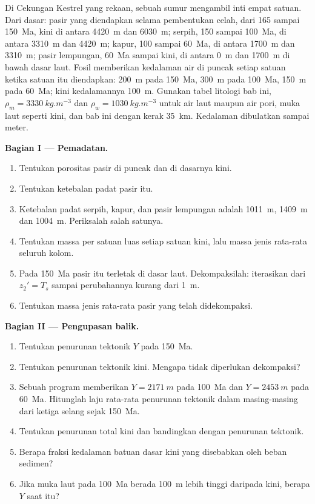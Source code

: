 \begin{problem}\label{pb:b2:basins-compared:1}
Di Cekungan Kestrel yang rekaan, sebuah sumur mengambil inti empat satuan. Dari dasar: pasir yang diendapkan selama
pembentukan celah, dari 165 sampai \qty{150}{Ma}, kini di antara \qty{4420}{m} dan \qty{6030}{m}; serpih, 150
sampai \qty{100}{Ma}, di antara \qty{3310}{m} dan \qty{4420}{m}; kapur, 100 sampai \qty{60}{Ma}, di antara
\qty{1700}{m} dan \qty{3310}{m}; pasir lempungan, \qty{60}{Ma} sampai kini, di antara \qty{0}{m} dan
\qty{1700}{m} di bawah dasar laut. Fosil memberikan kedalaman air di puncak setiap satuan ketika satuan itu
diendapkan: \qty{200}{m} pada \qty{150}{Ma}, \qty{300}{m} pada \qty{100}{Ma}, \qty{150}{m} pada
\qty{60}{Ma}; kini kedalamannya \qty{100}{m}. Gunakan tabel litologi bab ini, $\rho_m =
\qty{3330}{kg.m^{-3}}$ dan $\rho_w = \qty{1030}{kg.m^{-3}}$ untuk air laut maupun air pori, muka laut
seperti kini, dan  bab ini dengan kerak \qty{35}{km}. Kedalaman dibulatkan sampai
meter.

\noindent\textbf{Bagian I --- Pemadatan.}
\begin{enumerate}
  \item Tentukan porositas pasir di puncak dan di dasarnya kini.
  \item Tentukan ketebalan padat pasir itu.
  \item Ketebalan padat serpih, kapur, dan pasir lempungan adalah \qty{1011}{m},
        \qty{1409}{m} dan \qty{1004}{m}. Periksalah salah satunya.
  \item Tentukan massa per satuan luas setiap satuan kini, lalu massa jenis rata-rata seluruh
        kolom.
  \item Pada \qty{150}{Ma} pasir itu terletak di dasar laut. Dekompaksilah: iterasikan dari $z_2' =
        T_s$ sampai perubahannya kurang dari \qty{1}{m}.
  \item Tentukan massa jenis rata-rata pasir yang telah didekompaksi.
\end{enumerate}

\noindent\textbf{Bagian II --- Pengupasan balik.}
\begin{enumerate}[resume]
  \item Tentukan penurunan tektonik $Y$ pada \qty{150}{Ma}.
  \item Tentukan penurunan tektonik kini. Mengapa tidak diperlukan dekompaksi?
  \item Sebuah program memberikan $Y = \qty{2171}{m}$ pada \qty{100}{Ma} dan $Y = \qty{2453}{m}$ pada
        \qty{60}{Ma}. Hitunglah laju rata-rata penurunan tektonik dalam masing-masing dari ketiga
        selang sejak \qty{150}{Ma}.
  \item Tentukan penurunan total kini dan bandingkan dengan penurunan tektonik.
  \item Berapa fraksi kedalaman batuan dasar kini yang disebabkan oleh beban sedimen?
  \item Jika muka laut pada \qty{100}{Ma} berada \qty{100}{m} lebih tinggi daripada kini, berapa $Y$
        saat itu?
\end{enumerate}


\end{problem}
